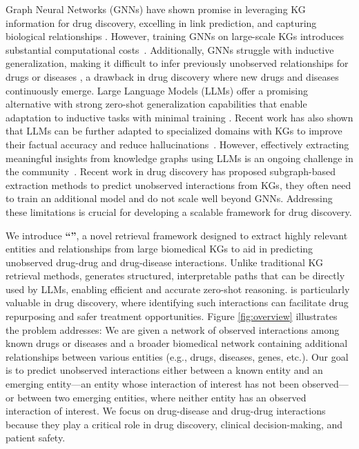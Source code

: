 Graph Neural Networks (GNNs) have shown promise in leveraging KG information for drug discovery, excelling in link prediction, and capturing biological relationships
\cite{Kipf2016SemiSupervisedCW, Schlichtkrull2017ModelingRD, zitnik2018modeling,huang2024foundation}.
However, training GNNs on large-scale KGs introduces substantial computational costs~\cite{abdallah2024task}. 
Additionally, GNNs struggle with inductive generalization, making it difficult to infer previously unobserved relationships for drugs or diseases \cite{hamilton2017inductive}, a drawback in drug discovery where new drugs and diseases continuously emerge.
Large Language Models (LLMs) offer a promising alternative with strong zero-shot generalization capabilities that enable adaptation to inductive tasks with minimal training \cite{kojima2022large, abdullahi2024learning, abdullahi2024retrieval}.
Recent work has also shown that LLMs can be further adapted to specialized domains with KGs to improve their factual accuracy and reduce hallucinations~\cite{abdullahi2024retrieval, abdullahi2024retrieval_jmir,edge2024localglobalgraphrag,wu2024medical}. 
However, effectively extracting meaningful insights from knowledge graphs using LLMs is an ongoing challenge in the community~\citep{fatemi2023talk, perozzi2024let}.
Recent work in drug discovery has proposed subgraph-based extraction methods to predict unobserved interactions from KGs, they often need to train an additional model and do not scale well beyond GNNs. 
Addressing these limitations is crucial for developing a scalable framework for drug discovery.

We introduce \textbf{``\sys''}, a novel retrieval framework designed to extract highly relevant entities and relationships from large biomedical KGs to aid in predicting unobserved drug-drug and drug-disease interactions. 
Unlike traditional KG retrieval methods, \sys generates structured, interpretable paths that can be directly used by LLMs, enabling efficient and accurate zero-shot reasoning.
\sys is particularly valuable in drug discovery, where identifying such interactions can facilitate drug repurposing and safer treatment opportunities.
Figure \ref{fig:overview} illustrates the problem \sys addresses: 
We are given a network of observed interactions among known drugs or diseases and a broader biomedical network containing additional relationships between various entities (e.g., drugs, diseases, genes, etc.). Our goal is to predict unobserved interactions either between a known entity and an emerging entity—an entity whose interaction of interest has not been observed—or between two emerging entities, where neither entity has an observed interaction of interest.
We focus on drug-disease and drug-drug interactions because they play a critical role in drug discovery, clinical decision-making, and patient safety.


